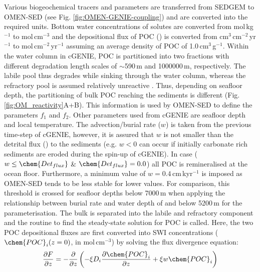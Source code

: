 \documentclass[gmd, manuscript]{copernicus}
\begin{document}
Various biogeochemical tracers and parameters are transferred from SEDGEM to OMEN-SED (see Fig. \ref{fig:OMEN-GENIE-coupling}) and are converted into the required units. 
Bottom water concentrations of solutes are converted from mol\,kg$^{-1}$ to mol\,cm$^{-3}$ and the depositional flux of POC () is converted from cm$^{3}$\,cm$^{-2}$\,yr$^{-1}$ 
to mol\,cm$^{-2}$\,yr$^{-1}$ assuming an average density of POC of 1.0\,cm$^{3}$\,g$^{-1}$. 
Within the water column in cGENIE, POC is partitioned into two fractions with different degradation length scales of  $\sim$590\,m and 1000000\,m, respectively. The labile pool thus degrades while sinking through the water column, 
whereas the refractory pool is assumed relatively unreactive \citep{ridgwell_marine_2007}. Thus, depending on seafloor depth, the partitioning of bulk POC reaching the sediments is different 
(Fig. \ref{fig:OM_reactivity}A+B). This information is used by OMEN-SED to define the parameters $f_1$ and $f_2$. 
Other parameters used from cGENIE are seafloor depth and local temperature. 
The advection/burial rate ($w$) is taken from the previous time-step of cGENIE, however, it is assured that $w$ is not smaller than the detrital flux ()
to the sediments (e.g. $w<0$ can occur if initially carbonate rich sediments are eroded during the spin-up of cGENIE). In case ($w \leq \chem{Det_{flux}}$ \& $\chem{Det_{flux}} = 0.0$) all POC is remineralised 
at the ocean floor. Furthermore, a minimum value of $w=0.4$\,cm\,kyr$^{-1}$ is imposed as OMEN-SED tends to be less stable for lower values. %
For comparison, this threshold is crossed for seafloor depths below 7000\,m when applying the relationship between burial rate and water depth of \citet{middelburg_empirical_1997} and below 5200\,m for the \citet{burwicz_estimation_2011} 
parameterisation. The bulk  is separated into the labile and refractory component and the routine to find the steady-state solution for POC is called. 
Here, the two POC depositional fluxes are first converted into SWI concentrations ($\chem{POC}_i(z=0)$, in mol\,cm$^{-3}$) by solving the flux divergence equation: 
\begin{equation}
\frac{\partial F}{\partial z}=-\frac{\partial}{\partial z}\left( -\xi D_i \frac{\partial \chem{POC}_i}{\partial z} +\xi w \chem{POC}_i\right) \label{Eq_flux_divergence}
\end{equation}
\end{document}
